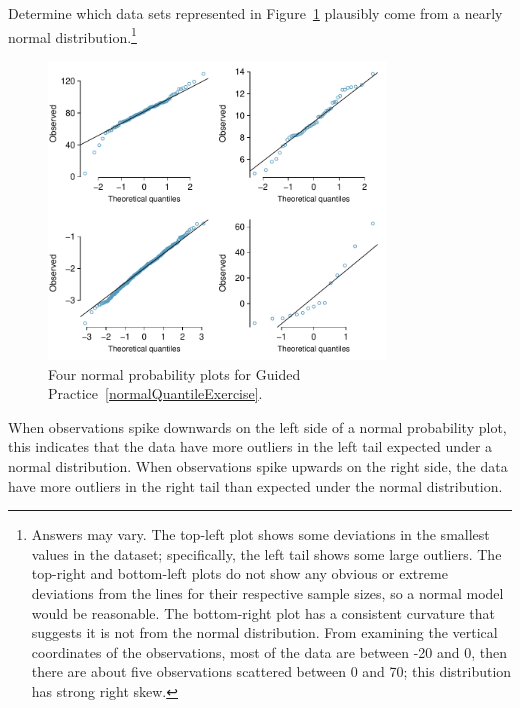\begin{exercise}\label{normalQuantileExercise}
	Determine which data sets represented in Figure~\ref{normalQuantileExer} plausibly come from a nearly normal distribution.\footnote{Answers may vary. The top-left plot shows some deviations in the smallest values in the dataset; specifically, the left tail shows some large outliers. The top-right and bottom-left plots do not show any obvious or extreme deviations from the lines for their respective sample sizes, so a normal model would be reasonable. The bottom-right plot has a consistent curvature that suggests it is not from the normal distribution. From examining the vertical coordinates of the observations, most of the data are between -20 and 0, then there are about five observations scattered between 0 and 70; this distribution has strong right skew.}
\end{exercise}

\begin{figure}[h!]
	\centering
	\includegraphics[width=0.80\textwidth]{ch_distributions_oi_biostat/figures/normalQuantileExer/normalQuantileExer}
	\caption{Four normal probability plots for Guided Practice~\ref{normalQuantileExercise}.}
	\label{normalQuantileExer}
\end{figure}


When observations spike downwards on the left side of a normal probability plot, this indicates that the data have more outliers in the left tail expected under a normal distribution. When observations spike upwards on the right side, the data have more outliers in the right tail than expected under the normal distribution.

